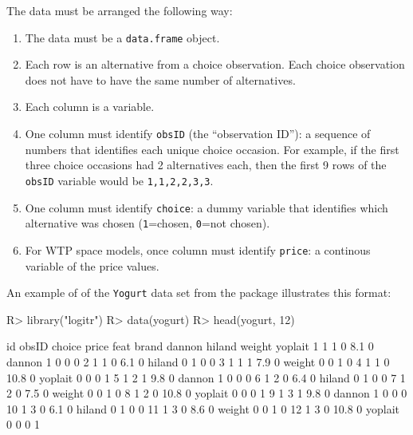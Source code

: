 \documentclass[article]{jss}
\providecommand{\tightlist}{%
  \setlength{\itemsep}{0pt}\setlength{\parskip}{0pt}}
\begin{document}
The data must be arranged the following way:

\begin{enumerate}
\def\labelenumi{\arabic{enumi}.}
\tightlist
\item
  The data must be a \texttt{data.frame} object.
\item
  Each row is an alternative from a choice observation. Each choice
  observation does not have to have the same number of alternatives.
\item
  Each column is a variable.
\item
  One column must identify \texttt{obsID} (the ``observation ID''): a
  sequence of numbers that identifies each unique choice occasion. For
  example, if the first three choice occasions had 2 alternatives each,
  then the first 9 rows of the \texttt{obsID} variable would be
  \texttt{1,1,2,2,3,3}.
\item
  One column must identify \texttt{choice}: a dummy variable that
  identifies which alternative was chosen (\texttt{1}=chosen,
  \texttt{0}=not chosen).
\item
  For WTP space models, once column must identify \texttt{price}: a
  continous variable of the price values.
\end{enumerate}

An example of of the \texttt{Yogurt} data set from the 
package illustrates this format:

\begin{CodeChunk}

\begin{CodeInput}
R> library("logitr")
R> data(yogurt)
R> head(yogurt, 12)
\end{CodeInput}

\begin{CodeOutput}
   id obsID choice price feat   brand dannon hiland weight yoplait
1   1     1      0   8.1    0  dannon      1      0      0       0
2   1     1      0   6.1    0  hiland      0      1      0       0
3   1     1      1   7.9    0  weight      0      0      1       0
4   1     1      0  10.8    0 yoplait      0      0      0       1
5   1     2      1   9.8    0  dannon      1      0      0       0
6   1     2      0   6.4    0  hiland      0      1      0       0
7   1     2      0   7.5    0  weight      0      0      1       0
8   1     2      0  10.8    0 yoplait      0      0      0       1
9   1     3      1   9.8    0  dannon      1      0      0       0
10  1     3      0   6.1    0  hiland      0      1      0       0
11  1     3      0   8.6    0  weight      0      0      1       0
12  1     3      0  10.8    0 yoplait      0      0      0       1
\end{CodeOutput}
\end{CodeChunk}
\end{document}
